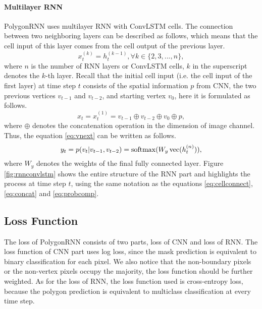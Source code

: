 

\paragraph{Multilayer RNN}
PolygonRNN uses multilayer RNN with ConvLSTM cells. The connection between two neighboring layers can be described as follows, which means that the cell input of this layer comes from the cell output of the previous layer.
\begin{equation}\label{eq:cellconnect}
	x_t^{(k)} = h_t^{(k-1)}, \forall k \in \{2,3,...,n\},
\end{equation}
where $n$ is the number of RNN layers or ConvLSTM cells, $k$ in the superscript denotes the $k$-th layer. Recall that the initial cell input (i.e. the cell input of the first layer) at time step $t$ consists of the spatial information $p$ from CNN, the two previous vertices $v_{t-1}$ and $v_{t-2}$, and starting vertex $v_0$, here it is formulated as follows.
\begin{equation}\label{eq:concat}
	x_t = x_t^{(1)} = v_{t-1} \oplus v_{t-2} \oplus v_0 \oplus p,
\end{equation}
where $\oplus$ denotes the concatenation operation in the dimension of image channel. Thus, the equation \ref{eq:vnext} can be written as follows.
\begin{equation}\label{eq:probcomp}
	y_t = p(v_t|v_{t-1}, v_{t-2}) = \operatorname{softmax}(W_y\operatorname{vec}(h_t^{(n)})),
\end{equation}
where $W_y$ denotes the weights of the final fully connected layer. Figure \ref{fig:rnnconvlstm} shows the entire structure of the RNN part and highlights the process at time step $t$, using the same notation as the equations \ref{eq:cellconnect}, \ref{eq:concat} and \ref{eq:probcomp}.



\subsection{Loss Function}
The loss of PolygonRNN consists of two parts, loss of CNN and loss of RNN. The loss function of CNN part uses log loss, since the mask prediction is equivalent to binary classification for each pixel. We also notice that the non-boundary pixels or the non-vertex pixels occupy the majority, the loss function should be further weighted. As for the loss of RNN, the loss function used is cross-entropy loss, because the polygon prediction is equivalent to multiclass classification at every time step.

